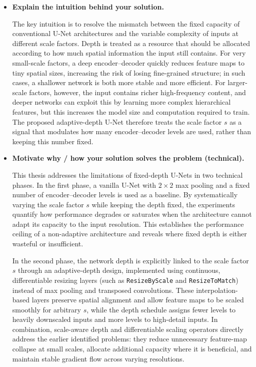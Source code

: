 \begin{itemize}
\item \textbf{Explain the intuition behind your solution.}

The key intuition is to resolve the mismatch between the fixed capacity of conventional U-Net architectures and the variable complexity of inputs at different scale factors. Depth is treated as a resource that should be allocated according to how much spatial information the input still contains. For very small-scale factors, a deep encoder–decoder quickly reduces feature maps to tiny spatial sizes, increasing the risk of losing fine-grained structure; in such cases, a shallower network is both more stable and more efficient. For larger-scale factors, however, the input contains richer high-frequency content, and deeper networks can exploit this by learning more complex hierarchical features, but this increases the model size and computation required to train. The proposed adaptive-depth U-Net therefore treats the scale factor $s$ as a signal that modulates how many encoder–decoder levels are used, rather than keeping this number fixed.


\item \textbf{Motivate why / how your solution solves the problem (technical).}

This thesis addresses the limitations of fixed-depth U-Nets in two technical phases. In the first phase, a vanilla U-Net with $2 \times 2$ max pooling and a fixed number of encoder–decoder levels is used as a baseline. By systematically varying the scale factor $s$ while keeping the depth fixed, the experiments quantify how performance degrades or saturates when the architecture cannot adapt its capacity to the input resolution. This establishes the performance ceiling of a non-adaptive architecture and reveals where fixed depth is either wasteful or insufficient.

In the second phase, the network depth is explicitly linked to the scale factor $s$ through an adaptive-depth design, implemented using continuous, differentiable resizing layers (such as \texttt{ResizeByScale} and \texttt{ResizeToMatch}) instead of max pooling and transposed convolutions. These interpolation-based layers preserve spatial alignment and allow feature maps to be scaled smoothly for arbitrary $s$, while the depth schedule assigns fewer levels to heavily downscaled inputs and more levels to high-detail inputs. In combination, scale-aware depth and differentiable scaling operators directly address the earlier identified problems: they reduce unnecessary feature-map collapse at small scales, allocate additional capacity where it is beneficial, and maintain stable gradient flow across varying resolutions.


\end{itemize}
